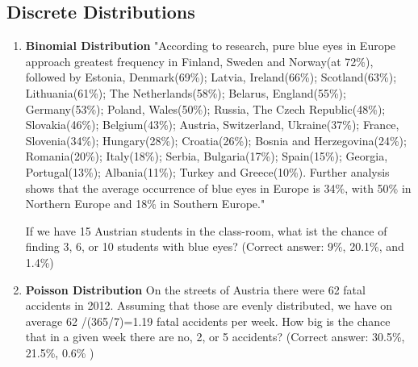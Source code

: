 \subsection{Discrete Distributions }

\begin{enumerate}
    \item \textbf{Binomial Distribution} "According to research, pure blue eyes in Europe approach greatest frequency in Finland, Sweden and Norway(at 72\%), followed by Estonia, Denmark(69\%); Latvia, Ireland(66\%); Scotland(63\%); Lithuania(61\%); The Netherlands(58\%); Belarus, England(55\%); Germany(53\%); Poland, Wales(50\%); Russia, The Czech Republic(48\%); Slovakia(46\%); Belgium(43\%); Austria, Switzerland, Ukraine(37\%); France, Slovenia(34\%); Hungary(28\%); Croatia(26\%); Bosnia and Herzegovina(24\%); Romania(20\%); Italy(18\%); Serbia, Bulgaria(17\%); Spain(15\%); Georgia, Portugal(13\%); Albania(11\%); Turkey and Greece(10\%). Further analysis shows that the average occurrence of blue eyes in Europe is 34\%, with 50\% in Northern Europe and 18\% in Southern Europe."

    If we have 15 Austrian students in the class-room, what ist the chance of finding 3, 6, or 10 students with blue eyes?
    (Correct answer: 9\%, 20.1\%, and 1.4\%)

    \item \textbf{Poisson Distribution} On the streets of Austria there were 62 fatal accidents in 2012. Assuming that those are evenly distributed, we have on average
    62 /(365/7)=1.19 fatal accidents per week. How big is the chance that in a given week there are no, 2, or 5 accidents?
    (Correct answer: 30.5\%, 21.5\%, 0.6\% )
\end{enumerate}
